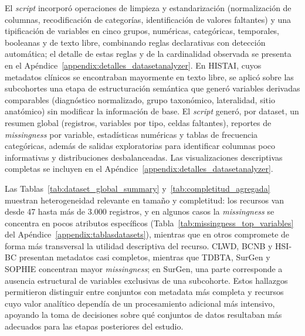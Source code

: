 El \textit{script} incorporó operaciones de limpieza y estandarización (normalización de columnas, recodificación de categorías, identificación de valores faltantes) y una tipificación de variables en cinco grupos, numéricas, categóricas, temporales, booleanas y de texto libre, combinando reglas declarativas con detección automática; el detalle de estas reglas y de la cardinalidad observada se presenta en el Apéndice~\ref{appendix:detalles_datasetanalyzer}. En HISTAI, cuyos metadatos clínicos se encontraban mayormente en texto libre, se aplicó sobre las subcohortes una etapa de estructuración semántica que generó variables derivadas comparables (diagnóstico normalizado, grupo taxonómico, lateralidad, sitio anatómico) sin modificar la información de base. El \textit{script} generó, por dataset, un resumen global (registros, variables por tipo, celdas faltantes), reportes de \textit{missingness} por variable, estadísticas numéricas y tablas de frecuencia categóricas, además de salidas exploratorias para identificar columnas poco informativas y distribuciones desbalanceadas. Las visualizaciones descriptivas completas se incluyen en el Apéndice~\ref{appendix:detalles_datasetanalyzer}.

Las Tablas~\ref{tab:dataset_global_summary} y~\ref{tab:completitud_agregada} muestran heterogeneidad relevante en tamaño y completitud: los recursos van desde 47 hasta más de 3.000 registros, y en algunos casos la \textit{missingness} se concentra en pocos atributos específicos (Tabla~\ref{tab:missingness_top_variables} del Apéndice~\ref{appendix:tablasdatasets}), mientras que en otros compromete de forma más transversal la utilidad descriptiva del recurso. CLWD, BCNB y HSI-BC presentan metadatos casi completos, mientras que TDBTA, SurGen y SOPHIE concentran mayor \textit{missingness}; en SurGen, una parte corresponde a ausencia estructural de variables exclusivas de una subcohorte.\label{sec:nota_unificacion_surgen} Estos hallazgos permitieron distinguir entre conjuntos con metadata más completa y recursos cuyo valor analítico dependía de un procesamiento adicional más intensivo, apoyando la toma de decisiones sobre qué conjuntos de datos resultaban más adecuados para las etapas posteriores del estudio.

